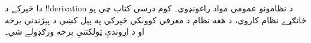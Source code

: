 \documentclass[../../../include/open-logic-chapter]{subfiles}
\begin{document}
      {}
      {}

\begin{editorial}
دا څپرکے د !!{derivation} د نظامونو عمومي مواد راغونډوي۔ کوم درسي
کتاب چې يو ځانګړے نظام کاروي، د هغه نظام د معرفي کوونکي څپرکي په
پيل کښې د پېژندنې برخه او د اړوندې ټولکتنې برخه ورګډولے شي۔
\end{editorial}






\OLEndChapterHook
\end{document}
